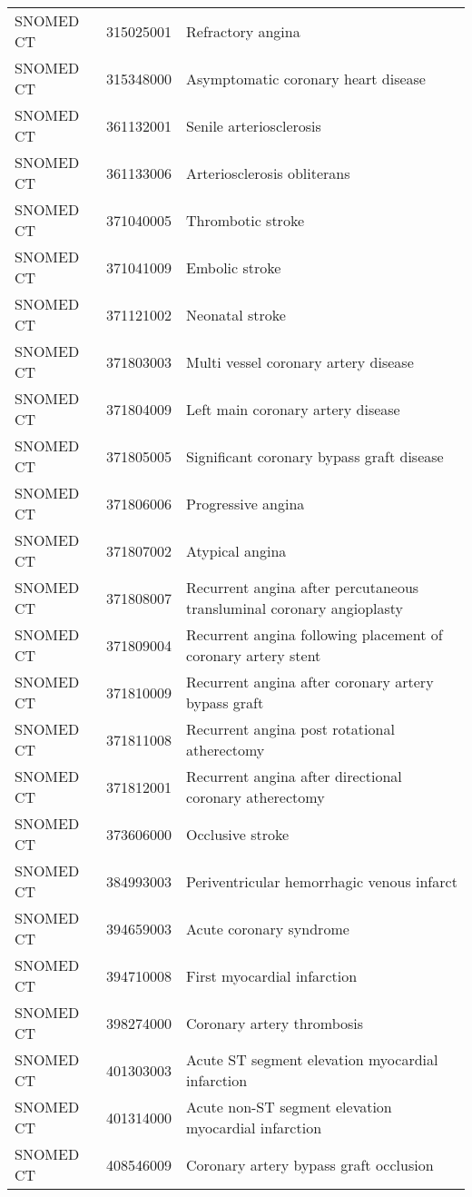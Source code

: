 \begin{longtable}{p{}p{}p{}}
  SNOMED CT & 315025001 & Refractory angina \\ 
  SNOMED CT & 315348000 & Asymptomatic coronary heart disease \\ 
  SNOMED CT & 361132001 & Senile arteriosclerosis \\ 
  SNOMED CT & 361133006 & Arteriosclerosis obliterans \\ 
  SNOMED CT & 371040005 & Thrombotic stroke \\ 
  SNOMED CT & 371041009 & Embolic stroke \\ 
  SNOMED CT & 371121002 & Neonatal stroke \\ 
  SNOMED CT & 371803003 & Multi vessel coronary artery disease \\ 
  SNOMED CT & 371804009 & Left main coronary artery disease \\ 
  SNOMED CT & 371805005 & Significant coronary bypass graft disease \\ 
  SNOMED CT & 371806006 & Progressive angina \\ 
  SNOMED CT & 371807002 & Atypical angina \\ 
  SNOMED CT & 371808007 & Recurrent angina after percutaneous transluminal coronary angioplasty \\ 
  SNOMED CT & 371809004 & Recurrent angina following placement of coronary artery stent \\ 
  SNOMED CT & 371810009 & Recurrent angina after coronary artery bypass graft \\ 
  SNOMED CT & 371811008 & Recurrent angina post rotational atherectomy \\ 
  SNOMED CT & 371812001 & Recurrent angina after directional coronary atherectomy \\ 
  SNOMED CT & 373606000 & Occlusive stroke \\ 
  SNOMED CT & 384993003 & Periventricular hemorrhagic venous infarct \\ 
  SNOMED CT & 394659003 & Acute coronary syndrome \\ 
  SNOMED CT & 394710008 & First myocardial infarction \\ 
  SNOMED CT & 398274000 & Coronary artery thrombosis \\ 
  SNOMED CT & 401303003 & Acute ST segment elevation myocardial infarction \\ 
  SNOMED CT & 401314000 & Acute non-ST segment elevation myocardial infarction \\ 
  SNOMED CT & 408546009 & Coronary artery bypass graft occlusion \\ 

\end{longtable}
